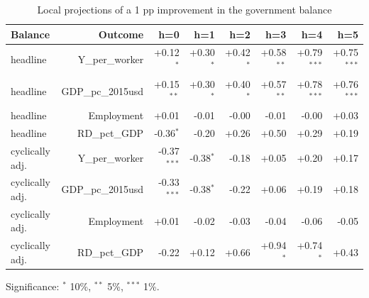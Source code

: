 \begin{table}[htbp]
\centering\small
\caption{Local projections of a 1 pp improvement in the government balance}
\label{tab:fiscal}
\begin{tabular}{lrrrrrrr}
\toprule
Balance & Outcome & h=0 & h=1 & h=2 & h=3 & h=4 & h=5 \\
\midrule
headline & Y\_per\_worker & +0.12$^{*}$ & +0.30$^{*}$ & +0.42$^{*}$ & +0.58$^{**}$ & +0.79$^{***}$ & +0.75$^{***}$ \\
headline & GDP\_pc\_2015usd & +0.15$^{**}$ & +0.30$^{*}$ & +0.40$^{*}$ & +0.57$^{**}$ & +0.78$^{***}$ & +0.76$^{***}$ \\
headline & Employment & +0.01 & -0.01 & -0.00 & -0.01 & -0.00 & +0.03 \\
headline & RD\_pct\_GDP & -0.36$^{*}$ & -0.20 & +0.26 & +0.50 & +0.29 & +0.19 \\
cyclically adj. & Y\_per\_worker & -0.37$^{***}$ & -0.38$^{*}$ & -0.18 & +0.05 & +0.20 & +0.17 \\
cyclically adj. & GDP\_pc\_2015usd & -0.33$^{***}$ & -0.38$^{*}$ & -0.22 & +0.06 & +0.19 & +0.18 \\
cyclically adj. & Employment & +0.01 & -0.02 & -0.03 & -0.04 & -0.06 & -0.05 \\
cyclically adj. & RD\_pct\_GDP & -0.22 & +0.12 & +0.66 & +0.94$^{*}$ & +0.74$^{*}$ & +0.43 \\
\bottomrule
\end{tabular}
\par\footnotesize Significance: $^{*}$ 10\%, $^{**}$ 5\%, $^{***}$ 1\%.
\end{table}
